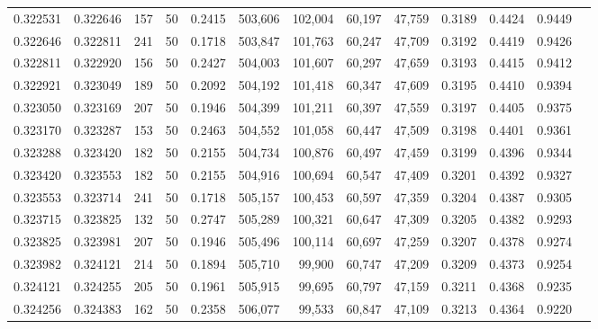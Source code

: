 \begin{tabular}{rrrrrrrrrrrrr}
0.322531 & 0.322646 &   157 &  50 &                                     0.2415 & 503,606 & 102,004 &  60,197 &  47,759 & 0.3189 & 0.4424 & 0.9449 \\
0.322646 & 0.322811 &   241 &  50 &                                     0.1718 & 503,847 & 101,763 &  60,247 &  47,709 & 0.3192 & 0.4419 & 0.9426 \\
0.322811 & 0.322920 &   156 &  50 &                                     0.2427 & 504,003 & 101,607 &  60,297 &  47,659 & 0.3193 & 0.4415 & 0.9412 \\
0.322921 & 0.323049 &   189 &  50 &                                     0.2092 & 504,192 & 101,418 &  60,347 &  47,609 & 0.3195 & 0.4410 & 0.9394 \\
0.323050 & 0.323169 &   207 &  50 &                                     0.1946 & 504,399 & 101,211 &  60,397 &  47,559 & 0.3197 & 0.4405 & 0.9375 \\
0.323170 & 0.323287 &   153 &  50 &                                     0.2463 & 504,552 & 101,058 &  60,447 &  47,509 & 0.3198 & 0.4401 & 0.9361 \\
0.323288 & 0.323420 &   182 &  50 &                                     0.2155 & 504,734 & 100,876 &  60,497 &  47,459 & 0.3199 & 0.4396 & 0.9344 \\
0.323420 & 0.323553 &   182 &  50 &                                     0.2155 & 504,916 & 100,694 &  60,547 &  47,409 & 0.3201 & 0.4392 & 0.9327 \\
0.323553 & 0.323714 &   241 &  50 &                                     0.1718 & 505,157 & 100,453 &  60,597 &  47,359 & 0.3204 & 0.4387 & 0.9305 \\
0.323715 & 0.323825 &   132 &  50 &                                     0.2747 & 505,289 & 100,321 &  60,647 &  47,309 & 0.3205 & 0.4382 & 0.9293 \\
0.323825 & 0.323981 &   207 &  50 &                                     0.1946 & 505,496 & 100,114 &  60,697 &  47,259 & 0.3207 & 0.4378 & 0.9274 \\
0.323982 & 0.324121 &   214 &  50 &                                     0.1894 & 505,710 &  99,900 &  60,747 &  47,209 & 0.3209 & 0.4373 & 0.9254 \\
0.324121 & 0.324255 &   205 &  50 &                                     0.1961 & 505,915 &  99,695 &  60,797 &  47,159 & 0.3211 & 0.4368 & 0.9235 \\
0.324256 & 0.324383 &   162 &  50 &                                     0.2358 & 506,077 &  99,533 &  60,847 &  47,109 & 0.3213 & 0.4364 & 0.9220 \\

\end{tabular}
